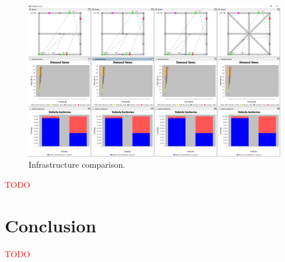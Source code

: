 \documentclass[10pt,twocolumn]{article}
\begin{document}
\begin{figure}[!ht]
    \includegraphics[width=\columnwidth]{../../screenshots/infrastructure-comparison.png}
    \caption{Infrastructure comparison.}
    \label{fig:infratructure-comparison}
\end{figure}

\textcolor{red}{TODO}

\section{Conclusion}
\label{sec:conclusion}

\textcolor{red}{TODO}



\end{document}
